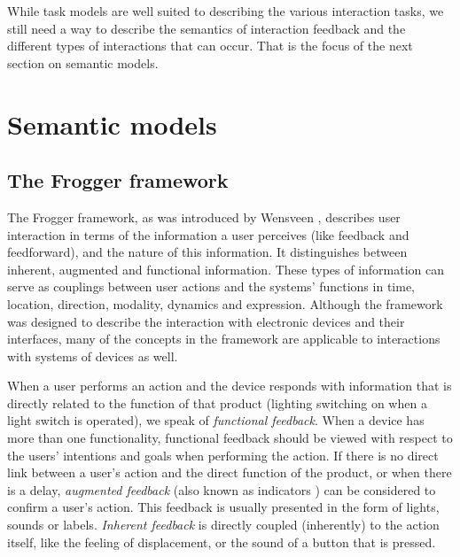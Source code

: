 While task models are well suited to describing the various interaction tasks, we still need a way to describe the semantics of interaction feedback and the different types of interactions that can occur. That is the focus of the next section on semantic models.	

\section{Semantic models}
%
\subsection{The Frogger framework}
\label{interactionFrogger}
The Frogger framework, as was introduced by Wensveen \cite{Wensveen2005}, describes user interaction in terms of the information a user perceives (like feedback and feedforward), and the nature of this information. It distinguishes between inherent, augmented and functional information. These types of information can serve as couplings between user actions and the systems' functions in time, location, direction, modality, dynamics and expression. Although the framework was designed to describe the interaction with electronic devices and their interfaces, many of the concepts in the framework are applicable to interactions with systems of devices as well.

When a user performs an action and the device responds with information that is directly related to the function of that product (lighting switching on when a light switch is operated), we speak of \emph{functional feedback}. When a device has more than one functionality, functional feedback should be viewed with respect to the users' intentions and goals when performing the action. If there is no direct link between a user's action and the direct function of the product, or when there is a delay, \emph{augmented feedback} (also known as indicators \cite{Thimbleby2007}) can be considered to confirm a user's action. This feedback is usually presented in the form of lights, sounds or labels. \emph{Inherent feedback} is directly coupled (inherently) to the action itself, like the feeling of displacement, or the sound of a button that is pressed.

